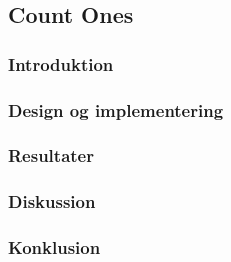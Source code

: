 \subsection{Count Ones}

\subsubsection{Introduktion}

\subsubsection{Design og implementering}
\subsubsection{Resultater}
\subsubsection{Diskussion}
\subsubsection{Konklusion}